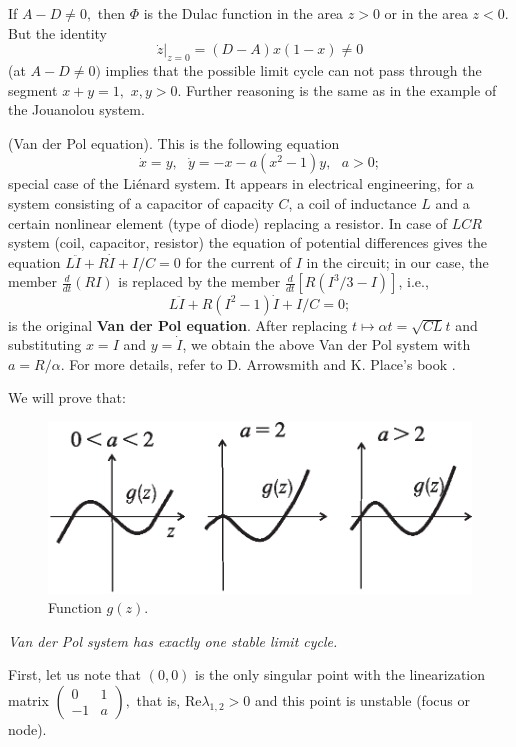 \begin{example}
	If $A-D\not=0,$ then $\Phi $ is the Dulac function in the area $z>0$ or in the area $z<0$. But the identity
	$$
	\dot{z}|_{z=0}=(D-A)x(1-x)\not=0
	$$
	(at $ A-D \not = 0) $ implies that the possible limit cycle can not pass through the segment $x+y=1,$ $x,y>0$. Further reasoning is the same as in the example of the Jouanolou system.
\end{example}

\begin{example}\label{example:2.35}(Van der Pol equation). 
	This is the following equation
	$$
	\dot{x}=y,\text{ \ \ }\dot{y}=-x-a(x^{2}-1)y,\text{ \ \ }a>0;
	$$
	special case of the Liénard system. It appears in electrical engineering, for a system consisting of a capacitor of capacity $C$, a coil of inductance $L$ and a certain nonlinear element (type of diode) replacing a resistor. In case of $LCR$ system (coil, capacitor, resistor) the equation of potential differences gives the equation $L\ddot{I}+R\dot{I}+I/C=0$ for the current of $ I $ in the circuit; in our case, the member $\frac{d}{dt}\left( RI\right) $ is replaced by the member $\frac{d}{dt}\left[ R\left( I^{3}/3-I\right) \right]$, i.e.,
	$$
	L\ddot{I}+R(I^{2}-1)\dot{I}+I/C=0;
	$$
	is the original \textbf {Van der Pol equation}. After replacing $t\longmapsto \alpha t=\sqrt{CL}t$ and substituting $x = I$ and $y = \dot{ I}$, we obtain the above Van der Pol system with $a=R/\alpha $. For more details, refer to D. Arrowsmith and K. Place's book \cite{ArPl}.
	
	We will prove that:
	\begin{figure}[!ht]
		\centering
		\includegraphics [scale=1]{jtr215}
		\caption{Function $g(z)$.}
		\label{fig:2.15}
	\end{figure}

	\textit{Van der Pol system has exactly one stable limit cycle.}
	
	First, let us note that $(0, 0)$ is the only singular point with the linearization matrix $\left(
	\begin{array}{ll}
	0 & 1 \\
	-1 & a%
	\end{array}%
	\right) ,$ that is, $\textrm{Re}\lambda _{1,2}>0$ and this point is unstable (focus or node).
	

\end{example}
